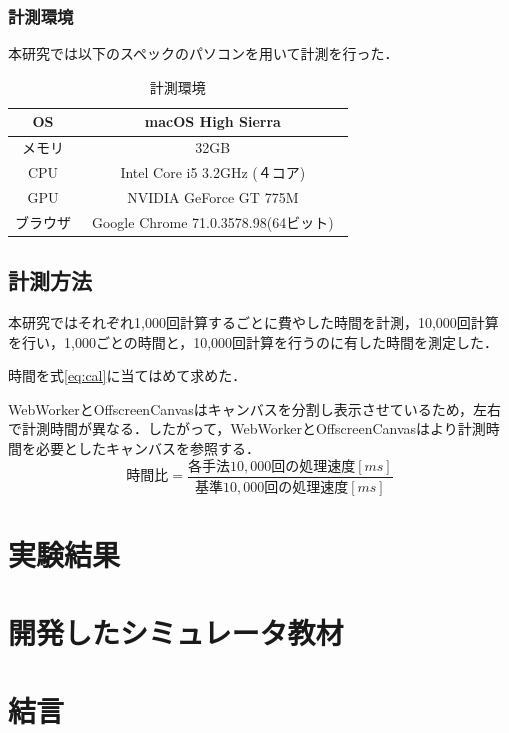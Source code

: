 \documentclass[a4j,12pt]{jsarticle}
\begin{document}
\subsubsection{計測環境}
本研究では以下のスペックのパソコンを用いて計測を行った．
\begin{table} [h]
\centering
\caption{計測環境}
	\begin{tabular} {| c | c |} \hline
	OS & macOS High Sierra \\ \hline
	メモリ & 32GB \\ \hline
	CPU & Intel Core i5 3.2GHz (４コア) \\ \hline
	GPU & NVIDIA GeForce GT 775M \\ \hline
	ブラウザ & Google Chrome 71.0.3578.98(64ビット)　\\ \hline
	\end{tabular} 
	\label{tab:tab1}
\end{table}

\subsection{計測方法}
本研究ではそれぞれ1,000回計算するごとに費やした時間を計測，10,000回計算を行い，1,000ごとの時間と，10,000回計算を行うのに有した時間を測定した．

時間を式\ref{eq:cal}に当てはめて求めた．

WebWorkerとOffscreenCanvasはキャンバスを分割し表示させているため，左右で計測時間が異なる．したがって，WebWorkerとOffscreenCanvasはより計測時間を必要としたキャンバスを参照する．
\begin{equation}
 時間比 = \frac { 各手法10,000回の処理速度 [ms]} { 基準10,000回の処理速度[ms] } 
\label{eq:cal}
\end{equation}

\newpage

\section{実験結果}
\newpage

\section{開発したシミュレータ教材}
\newpage

\section{結言}
\newpage
\end{document}
